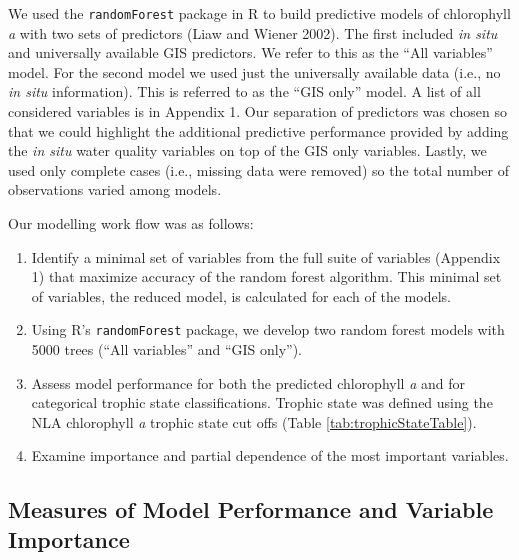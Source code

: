 \documentclass[12pt,]{article}
\begin{document}
We used the \texttt{randomForest} package in R to build predictive
models of chlorophyll \emph{a} with two sets of predictors (Liaw and
Wiener 2002). The first included \emph{in situ} and universally
available GIS predictors. We refer to this as the ``All variables''
model. For the second model we used just the universally available data
(i.e., no \emph{in situ} information). This is referred to as the ``GIS
only'' model. A list of all considered variables is in Appendix 1. Our
separation of predictors was chosen so that we could highlight the
additional predictive performance provided by adding the \emph{in situ}
water quality variables on top of the GIS only variables. Lastly, we
used only complete cases (i.e., missing data were removed) so the total
number of observations varied among models.

Our modelling work flow was as follows:

\begin{enumerate}
\def\labelenumi{\arabic{enumi}.}
\itemsep1pt\parskip0pt
\item
  Identify a minimal set of variables from the full suite of variables
  (Appendix 1) that maximize accuracy of the random forest algorithm.
  This minimal set of variables, the reduced model, is calculated for
  each of the models.
\item
  Using R's \texttt{randomForest} package, we develop two random forest
  models with 5000 trees (``All variables'' and ``GIS only'').
\item
  Assess model performance for both the predicted chlorophyll \emph{a}
  and for categorical trophic state classifications. Trophic state was
  defined using the NLA chlorophyll \emph{a} trophic state cut offs
  (Table \ref{tab:trophicStateTable}).
\item
  Examine importance and partial dependence of the most important
  variables.
\end{enumerate}

\subsection{Measures of Model Performance and Variable
Importance}\label{measures-of-model-performance-and-variable-importance}
\end{document}
